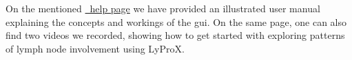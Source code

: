 \documentclass[\relativeRoot/main.tex]{subfiles}
\begin{document}
On the mentioned \href{https://lyprox.org/dashboard/help}{~help page} we have provided an illustrated user manual explaining the concepts and workings of the \gls{gui}. On the same page, one can also find two videos we recorded, showing how to get started with exploring patterns of lymph node involvement using LyProX.
\end{document}
